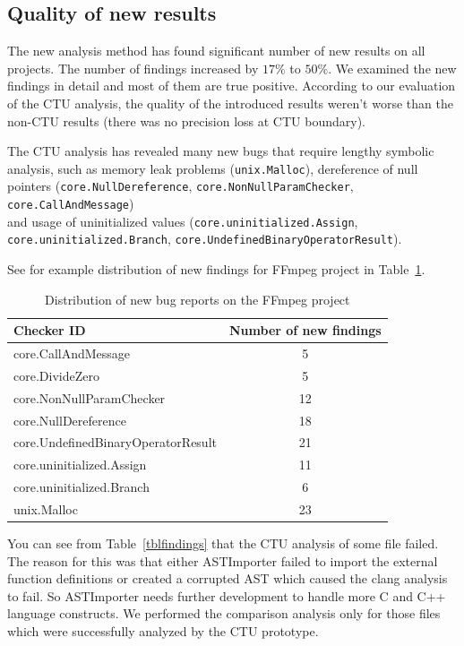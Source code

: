 \documentclass{article}
\begin{document}
\subsection{Quality of new results}
The new analysis method has found significant number of new results on all\\ projects. 
The number of findings increased by $17\%$ to $50\%$.
We examined the new findings in detail and most of them are true positive.
According to our evaluation of the CTU analysis, the quality of the introduced results
weren't worse than the non-CTU results (there was no precision loss at CTU boundary).

The CTU analysis has revealed many new bugs that require lengthy symbolic analysis,
such as memory leak problems (\texttt{unix.Malloc}), dereference of null pointers
(\texttt{core.NullDereference}, \texttt{core.NonNullParamChecker},
\texttt{core.CallAndMessage}) \\ and usage of uninitialized values
(\texttt{core.uninitialized.Assign}, \\ \texttt{core.uninitialized.Branch},
\texttt{core.UndefinedBinaryOperatorResult}).

See for example distribution of new findings for FFmpeg project in 
Table~\ref{tblffmpegbugs}.

\begin {table}[h!]
\centering
\begin{tabular}{| l|| c |}
\hline
Checker ID&                          Number of new findings \\
\hline
\hline
core.CallAndMessage                &  5 \\
\hline
core.DivideZero                    & 5 \\     
\hline
core.NonNullParamChecker           & 12 \\     
\hline
core.NullDereference               & 18 \\     
\hline
core.UndefinedBinaryOperatorResult & 21 \\     
\hline
core.uninitialized.Assign          & 11 \\     
\hline
core.uninitialized.Branch          & 6  \\     
\hline
unix.Malloc                        & 23 \\
\hline
\end{tabular}
\caption{Distribution of new bug reports on the FFmpeg project}
\label{tblffmpegbugs}
\end{table}

You can see from Table~\ref{tblfindings} that the CTU analysis of some file failed.
The reason for this was that either ASTImporter failed to import the external
function definitions or created a corrupted AST which caused the clang analysis
to fail. So ASTImporter needs further development to handle more C and C++ language
constructs. We performed the comparison analysis only for those files which were
successfully analyzed by the CTU prototype.
\end{document}

